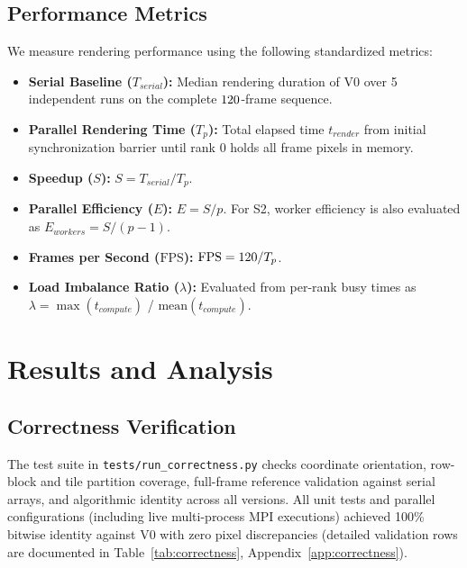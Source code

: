 \documentclass[11pt,a4paper]{article}
\begin{document}


\subsection{Performance Metrics}
We measure rendering performance using the following standardized metrics:
\begin{itemize}
    \item \textbf{Serial Baseline ($T_{serial}$):} Median rendering duration of V0 over 5 independent runs on the complete $120$-frame sequence.
    \item \textbf{Parallel Rendering Time ($T_p$):} Total elapsed time $t_{render}$ from initial synchronization barrier until rank 0 holds all frame pixels in memory.
    \item \textbf{Speedup ($S$):} $S = T_{serial} / T_p$.
    \item \textbf{Parallel Efficiency ($E$):} $E = S / p$. For S2, worker efficiency is also evaluated as $E_{workers} = S / (p - 1)$.
    \item \textbf{Frames per Second ($\text{FPS}$):} $\text{FPS} = 120 / T_p$.
    \item \textbf{Load Imbalance Ratio ($\lambda$):} Evaluated from per-rank busy times as $\lambda = \max(t_{compute})$ / $\text{mean}(t_{compute})$.
\end{itemize}

\section{Results and Analysis}
\label{sec:results}

\subsection{Correctness Verification}
The test suite in \texttt{tests/run\_correctness.py} checks coordinate orientation, row-block and tile partition coverage, full-frame reference validation against serial arrays, and algorithmic identity across all versions. All unit tests and parallel configurations (including live multi-process MPI executions) achieved 100\% bitwise identity against V0 with zero pixel discrepancies (detailed validation rows are documented in Table~\ref{tab:correctness}, Appendix~\ref{app:correctness}).
\end{document}
